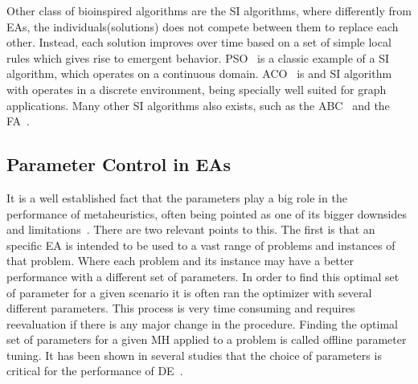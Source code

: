 Other class of bioinspired algorithms are the \ac{SI} algorithms, where differently from
\ac{EA}s, the individuals(solutions) does not compete between them to replace each other.
Instead, each solution improves over time based on a set of simple local rules which
gives rise to emergent behavior. \ac{PSO}~\cite{eberhart1995new} is a classic
example of a \ac{SI} algorithm, which operates on a continuous domain.
\ac{ACO}~\cite{dorigo1997ant} is and SI algorithm with operates in a discrete environment, being specially
well suited for graph applications. Many other \ac{SI} algorithms also exists, such
as the \ac{ABC}~\cite{karaboga2007powerful} and the
\ac{FA}~\cite{yang2009firefly}.


\vspace{2mm}

% 
% 

\subsection{Parameter Control in EAs}

It is a well established fact that the parameters play a big role in the
performance of metaheuristics, often being pointed as one of its bigger
downsides and limitations~\cite{parpinelli18review}. There are two relevant points to this.
The first is that an specific \ac{EA} is intended to be used to a vast range of
problems and instances of that problem. Where each problem and its instance
may have a better performance with a different set of parameters. In order
to find this optimal set of parameter for a given scenario it is often
ran the optimizer with several different parameters. This process is
very time consuming and requires reevaluation if there is any major
change in the procedure. Finding the optimal set of parameters for a given
\ac{MH} applied to a problem is called offline parameter tuning.
It has been shown in several studies that the choice of parameters
is critical for the performance of \ac{DE}~\cite{karafotias2015parameter}.

